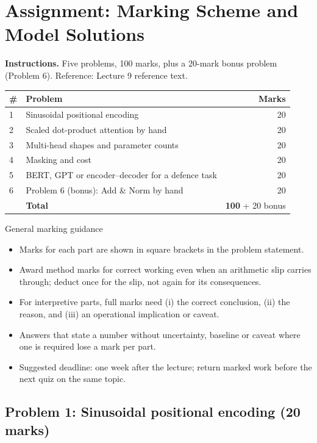 \documentclass[11pt]{article}
\begin{document}
\section{Assignment: Marking Scheme and Model Solutions}

\textbf{Instructions.} Five problems, 100 marks, plus a 20-mark bonus problem (Problem 6). Reference: Lecture 9 reference text.

\begin{center}\small\renewcommand{\arraystretch}{1.25}\begin{tabularx}{0.85\textwidth}{@{}l X r@{}}\toprule\textbf{\#} & \textbf{Problem} & \textbf{Marks}\\\midrule1 & Sinusoidal positional encoding & 20\\
2 & Scaled dot-product attention by hand & 20\\
3 & Multi-head shapes and parameter counts & 20\\
4 & Masking and cost & 20\\
5 & BERT, GPT or encoder--decoder for a defence task & 20\\
6 & Problem 6 (bonus): Add \& Norm by hand & 20\\\midrule & \textbf{Total} & \textbf{100} + 20 bonus\\\bottomrule\end{tabularx}\end{center}

\begin{instr}{General marking guidance}\begin{itemize}
\item Marks for each part are shown in square brackets in the problem statement.
\item Award method marks for correct working even when an arithmetic slip carries through; deduct once for the slip, not again for its consequences.
\item For interpretive parts, full marks need (i) the correct conclusion, (ii) the reason, and (iii) an operational implication or caveat.
\item Answers that state a number without uncertainty, baseline or caveat where one is required lose a mark per part.
\item Suggested deadline: one week after the lecture; return marked work before the next quiz on the same topic.
\end{itemize}\end{instr}

\subsection{Problem 1: Sinusoidal positional encoding \normalfont\small\color{GreyN}(20 marks)}
\end{document}
